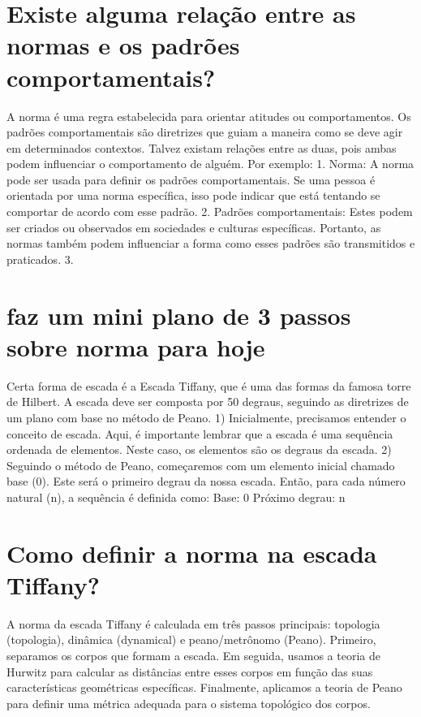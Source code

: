 \documentclass[11pt,a4paper]{article}
\begin{document}
\section{Existe alguma relação entre as normas e os padrões comportamentais?}
A norma é uma regra estabelecida para orientar atitudes ou comportamentos. Os padrões comportamentais são diretrizes que guiam a maneira como se deve agir em determinados contextos. Talvez existam relações entre as duas, pois ambas podem influenciar o comportamento de alguém. Por exemplo: 1. Norma: A norma pode ser usada para definir os padrões comportamentais. Se uma pessoa é orientada por uma norma específica, isso pode indicar que está tentando se comportar de acordo com esse padrão. 2. Padrões comportamentais: Estes podem ser criados ou observados em sociedades e culturas específicas. Portanto, as normas também podem influenciar a forma como esses padrões são transmitidos e praticados. 3.

\section{faz um mini plano de 3 passos sobre norma para hoje}
Certa forma de escada é a Escada Tiffany, que é uma das formas da famosa torre de Hilbert. A escada deve ser composta por 50 degraus, seguindo as diretrizes de um plano com base no método de Peano. 1) Inicialmente, precisamos entender o conceito de escada. Aqui, é importante lembrar que a escada é uma sequência ordenada de elementos. Neste caso, os elementos são os degraus da escada. 2) Seguindo o método de Peano, começaremos com um elemento inicial chamado base (0). Este será o primeiro degrau da nossa escada. Então, para cada número natural (n), a sequência é definida como: Base: 0 Próximo degrau: n

\section{Como definir a norma na escada Tiffany?}
A norma da escada Tiffany é calculada em três passos principais: topologia (topologia), dinâmica (dynamical) e peano/metrônomo (Peano). Primeiro, separamos os corpos que formam a escada. Em seguida, usamos a teoria de Hurwitz para calcular as distâncias entre esses corpos em função das suas características geométricas específicas. Finalmente, aplicamos a teoria de Peano para definir uma métrica adequada para o sistema topológico dos corpos.
\end{document}
